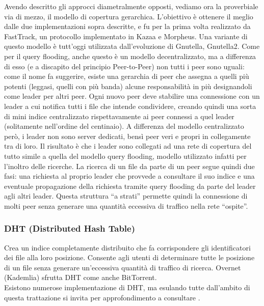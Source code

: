 Avendo descritto gli approcci diametralmente opposti, vediamo ora la proverbiale via di mezzo, il modello di copertura gerarchica. L'obiettivo è ottenere il meglio dalle due implementazioni sopra descritte, e fu per la prima volta realizzato da FastTrack, un protocollo implementato in Kazaa e Morpheus. Una variante di questo modello è tutt'oggi utilizzata dall'evoluzione di Gnutella, Gnutella2. Come per il query flooding, anche questo è un modello decentralizzato, ma a differenza di esso (e a discapito del principio Peer-to-Peer) non tutti i peer sono uguali: come il nome fa suggerire, esiste una gerarchia di peer che assegna a quelli più potenti (leggasi, quelli con più banda) alcune responsabilità in più designandoli come leader per altri peer. Ogni nuovo peer deve stabilire una connessione con un leader a cui notifica tutti i file che intende condividere, creando quindi una sorta di mini indice centralizzato rispettavamente ai peer connessi a quel leader (solitamente nell'ordine del centinaio). A differenza del modello centralizzato però, i leader non sono server dedicati, bensì peer veri e propri in collegamente tra di loro. Il risultato è che i leader sono collegati ad una rete di copertura del tutto simile a quella del modello query flooding, modello utilizzato infatti per l'inoltro delle ricerche. La ricerca di un file da parte di un peer segue quindi due fasi: una richiesta al proprio leader che provvede a consultare il suo indice e una eventuale propagazione della richiesta tramite query flooding da parte del leader agli altri leader. Questa struttura ``a strati'' permette quindi la connessione di molti peer senza generare una quantità eccessiva di traffico nella rete ``ospite''.

\subsubsection{DHT (Distributed Hash Table)}\label{dht-distributed-hash-table}

Crea un indice completamente distribuito che fa corrispondere gli identificatori dei file alla loro posizione. Consente agli utenti di determinare tutte le posizione di un file senza generare un'eccessiva quantità di traffico di ricerca. Overnet (Kademlia) sfrutta DHT come anche BitTorrent.\\
Esistono numerose implementazione di DHT, ma esulando tutte dall'ambito di questa trattazione si invita per approfondimento a consultare \cite{distributed-computing}.
